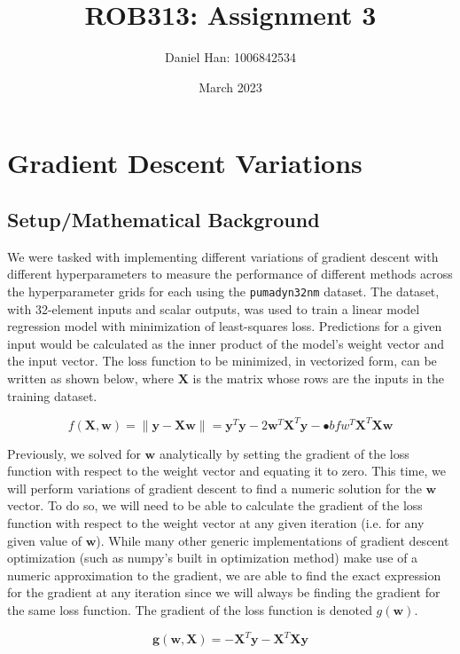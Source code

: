 \documentclass{article}
\title{ROB313: Assignment 3}
\author{Daniel Han: 1006842534}
\date{March 2023}
\begin{document}
\maketitle

\section{Gradient Descent Variations}

\subsection{Setup/Mathematical Background}
We were tasked with implementing different variations of gradient descent with different hyperparameters to measure the performance of different methods across the hyperparameter grids for each using the \verb+pumadyn32nm+ dataset. The dataset, with 32-element inputs and scalar outputs, was used to train a linear model regression model with minimization of least-squares loss. Predictions for a given input would be calculated as the inner product of the model's weight vector and the input vector. The loss function to be minimized, in vectorized form, can be written as shown below, where $\mathbf{X}$ is the matrix whose rows are the inputs in the training dataset.

\begin{equation}
f(\mathbf{X}, \mathbf{w}) = \| \mathbf{y} - \mathbf{X}\mathbf{w} \| = \mathbf{y}^{T} \mathbf{y} - 2\mathbf{w}^{T} \mathbf{X}^{T} \mathbf{y} - \mathbf{•}bf{w}^{T} \mathbf{X}^{T} \mathbf{X}\mathbf{w}
\end{equation}

Previously, we solved for $\mathbf{w}$ analytically by setting the gradient of the loss function with respect to the weight vector and equating it to zero. This time, we will perform variations of gradient descent to find a numeric solution for the $\mathbf{w}$ vector. To do so, we will need to be able to calculate the gradient of the loss function with respect to the weight vector at any given iteration (i.e. for any given value of $\mathbf{w}$). While many other generic implementations of gradient descent optimization (such as numpy's built in optimization method) make use of a numeric approximation to the gradient, we are able to find the exact expression for the gradient at any iteration since we will always be finding the gradient for the same loss function. The gradient of the loss function is denoted $g(\mathbf{w})$.

\begin{equation}
\mathbf{g}(\mathbf{w}, \mathbf{X}) = -\mathbf{X}^T\mathbf{y} - \mathbf{X}^{T}\mathbf{X}\mathbf{y}
\end{equation}
\end{document}
